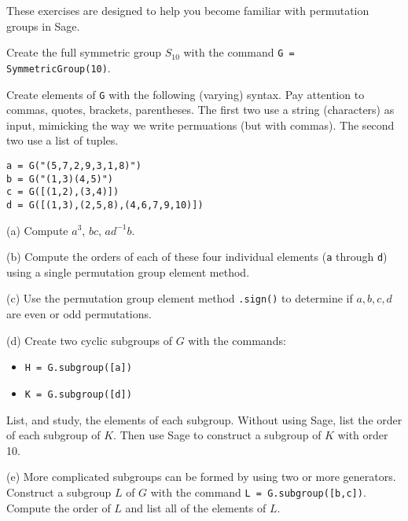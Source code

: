These exercises are designed to help you become familiar with permutation groups in Sage.
%
\begin{sageverbatim}\end{sageverbatim}
%
%
Create the full symmetric group $S_{10}$ with the command \verb?G = SymmetricGroup(10)?.
\begin{sageverbatim}\end{sageverbatim}
%
Create elements of \verb?G? with the following (varying) syntax.  Pay attention to commas, quotes, brackets, parentheses.  The first two use a string (characters) as input, mimicking the way we write permuations (but with commas).  The second two use a list of tuples.\par\noindent
\verb?a = G("(5,7,2,9,3,1,8)")?\\
\verb?b = G("(1,3)(4,5)")?\\
\verb?c = G([(1,2),(3,4)])?\\
\verb?d = G([(1,3),(2,5,8),(4,6,7,9,10)])?\par\noindent
%
(a)  Compute $a^3$, $bc$, $ad^{-1}b$.\par\noindent
%
(b)  Compute the orders of each of these four individual elements (\verb?a? through \verb?d?) using a single permutation group element method.\par\noindent
%
(c)  Use the permutation group element method \verb?.sign()? to determine if $a,b,c,d$ are even or odd permutations.\par\noindent
%
(d)  Create two cyclic subgroups of $G$ with the commands:
%
\begin{itemize}
\item\verb?H = G.subgroup([a])?
\item\verb?K = G.subgroup([d])?
\end{itemize}
%
List, and study, the elements of each subgroup.  Without using Sage, list the order of each subgroup of $K$.  Then use Sage to construct a subgroup of $K$ with order 10.\par\noindent
%
(e)  More complicated subgroups can be formed by using two or more generators.  Construct a subgroup $L$ of $G$ with the command \verb?L = G.subgroup([b,c])?.  Compute the order of $L$ and list all of the elements of $L$.
